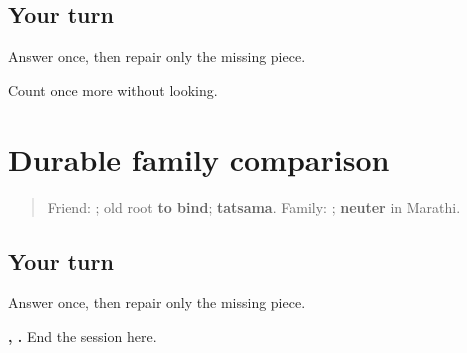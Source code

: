 \subsection*{Your turn}
Answer once, then repair only the missing piece.

\begin{tcolorbox}[breakable,colback=teal!4,colframe=teal!35!black,title={Before you move on}]
Count once more without looking.
\end{tcolorbox}
\section[mitra / kutumb]{Durable family comparison}

\label{lesson:MR-R14-kutumb-r3}



\begin{quote}
Friend: \textbf{}; old root \textbf{to bind}; \textbf{tatsama}. Family: \textbf{}; \textbf{neuter} in Marathi.
\end{quote}

\subsection*{Your turn}
Answer once, then repair only the missing piece.

\begin{tcolorbox}[breakable,colback=teal!4,colframe=teal!35!black,title={Before you move on}]
\textbf{, .} End the session here.
\end{tcolorbox}
